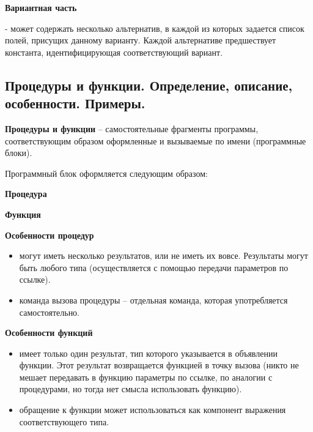 {\bf{Вариантная часть}}


- может содержать несколько альтернатив, в каждой из которых задается список полей, присущих данному варианту. Каждой альтернативе предшествует константа, идентифицирующая соответствующий вариант.






\newpage\subsection{Процедуры и функции. Определение, описание, особенности. Примеры. }

\begin{myquote}
            
\end{myquote}

{\bf{Процедуры и функции}} – самостоятельные фрагменты программы, соответствующим образом оформленные и вызываемые по имени (программные блоки).

Программный блок оформляется следующим образом:

{\bf{Процедура}}

{\bf{Функция}}

{\bf{Особенности процедур}}

\begin{itemize}
\item могут иметь несколько результатов, или не иметь их вовсе. Результаты могут быть любого типа (осуществляется с помощью передачи параметров по ссылке).

\item команда вызова процедуры – отдельная команда, которая употребляется самостоятельно.
\end{itemize}

{\bf{Особенности функций}}
\begin{itemize}

\item имеет только один результат, тип которого указывается в объявлении функции. Этот результат возвращается функцией в точку вызова (никто не мешает передавать в функцию параметры по ссылке, по аналогии с процедурами, но тогда нет смысла использовать функцию).

\item обращение к функции может использоваться как компонент выражения соответствующего типа.
\end{itemize}



